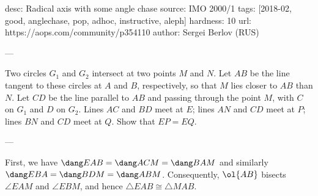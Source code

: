 desc: Radical axis with some angle chase
source: IMO 2000/1
tags: [2018-02, good, anglechase, pop, adhoc, instructive, aleph]
hardness: 10
url: https://aops.com/community/p354110
author: Sergei Berlov (RUS)

---

Two circles $G_1$ and $G_2$ intersect at two points $M$ and $N$.
Let $AB$ be the line tangent to these circles at $A$ and $B$,
respectively, so that $M$ lies closer to $AB$ than $N$.
Let $CD$ be the line parallel to $AB$
and passing through the point $M$,
with $C$ on $G_1$ and $D$ on $G_2$.
Lines $AC$ and $BD$ meet at $E$; lines $AN$ and $CD$ meet at $P$;
lines $BN$ and $CD$ meet at $Q$.
Show that $EP = EQ$.

---

First, we have $\dang EAB = \dang ACM = \dang BAM$
and similarly $\dang EBA = \dang BDM = \dang ABM$.
Consequently, $\ol{AB}$ bisects $\angle EAM$ and $\angle EBM$,
and hence $\triangle EAB \cong \triangle MAB$.

